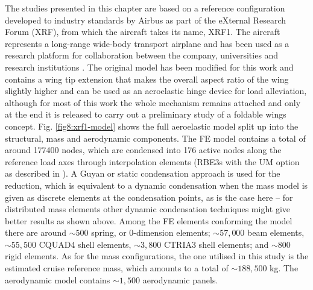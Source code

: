\documentclass[11pt]{article}
\begin{document}
The studies presented in this chapter are based on a reference configuration developed to industry standards by Airbus as part of the eXternal Research Forum (XRF), from which the aircraft takes its name, XRF1. The aircraft represents a long-range wide-body transport airplane  and has been used as a research platform for collaboration between the company, universities and research institutions \cite{Klimmek2019}. The original model has been modified for this work and contains a wing tip extension that makes the overall aspect ratio of the wing slightly higher and can be used as an aeroelastic hinge device for load alleviation, although for most of this  work  the whole mechanism remains attached and only at the end it is released to carry out a preliminary study of a foldable wings concept. %
Fig. \ref{fig8:xrf1-model} shows the full aeroelastic model split up into the structural, mass and aerodynamic components. The FE model contains a total of around 177400 nodes, which are condensed into 176 active nodes along the reference load axes through interpolation elements (RBE3s with the UM option as described in \cite{Klimmek2014}). A Guyan or static condensation approach is used for the reduction, which is equivalent to a dynamic condensation when the mass model is given as discrete elements at the condensation points, as is the case here -- for distributed mass elements other dynamic condensation techniques might give better results as shown above. Among the FE elements conforming the model there are around $\sim 500$ spring, or 0-dimension elements; $\sim 57,000$ beam elements, $\sim 55,500$ CQUAD4 shell elements, $\sim 3,800$ CTRIA3 shell elements; and $\sim 800$ rigid elements. As for the mass configurations, the one utilised in this study is the estimated cruise reference mass, which amounts to a total of $\sim 188,500$ kg. The aerodynamic model contains $\sim 1,500$ aerodynamic panels.
\end{document}
